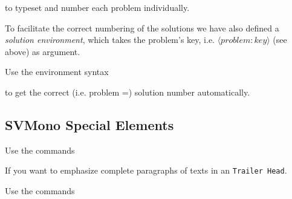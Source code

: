 \documentclass[graybox,square]{svmono}
\begin{document}
\begin{sloppy}
\cprotect{}

to typeset and number each problem individually.

To facilitate the correct numbering of the solutions we have also defined a {\it solution environment}, which takes the problem's key, i.e. $\langle problem{:}key\rangle$ (see above) as argument.

Use the environment syntax
\cprotect{}

to get the correct (i.e. problem =) solution number automatically.


\subsection{SVMono Special Elements}

Use the commands

\cprotect{}

If you want to emphasize complete paragraphs of texts in an \verb|Trailer Head|.  


Use the commands

\cprotect{}


\end{sloppy}
\end{document}
